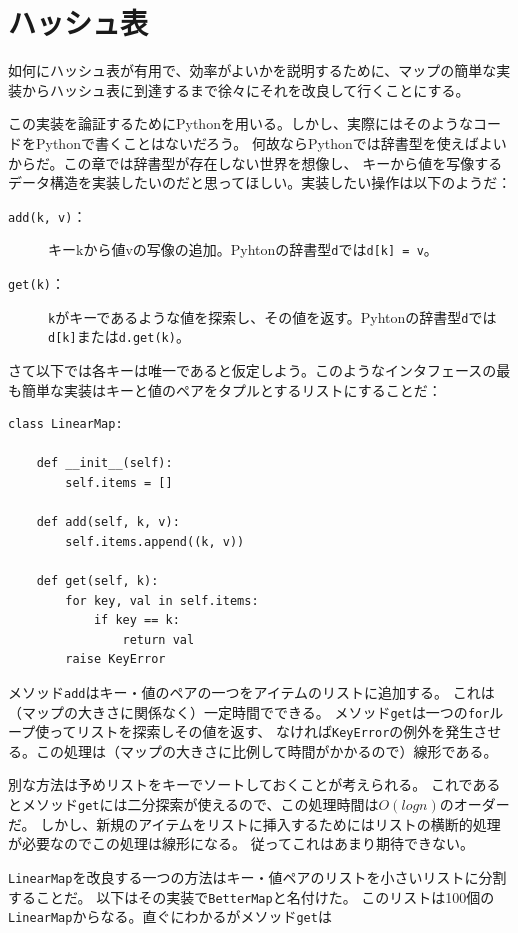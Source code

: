 \documentclass[a4j,12pt,makeidx]{jbook}
\begin{document}
\section{ハッシュ表}
如何にハッシュ表が有用で、効率がよいかを説明するために、マップの簡単な実装からハッシュ表に到達するまで徐々にそれを改良して行くことにする。\par
この実装を論証するためにPythonを用いる。しかし、実際にはそのようなコードをPythonで書くことはないだろう。
何故ならPythonでは辞書型を使えばよいからだ。この章では辞書型が存在しない世界を想像し、
キーから値を写像するデータ構造を実装したいのだと思ってほしい。実装したい操作は以下のようだ：
\begin{description}
\item[{\tt add(k, v)}：] キーkから値vの写像の追加。Pyhtonの辞書型{\tt d}では{\tt d[k] = v}。
\item[{\tt get(k)}：] {\tt k}がキーであるような値を探索し、その値を返す。Pyhtonの辞書型{\tt d}では{\tt d[k]}または{\tt d.get(k)}。
\end{description} \par
さて以下では各キーは唯一であると仮定しよう。このようなインタフェースの最も簡単な実装はキーと値のペアをタプルとするリストにすることだ：
\begin{verbatim}
class LinearMap:

    def __init__(self):
        self.items = []

    def add(self, k, v):
        self.items.append((k, v))

    def get(self, k):
        for key, val in self.items:
            if key == k:
                return val
        raise KeyError
\end{verbatim}
メソッド{\tt add}はキー・値のペアの一つをアイテムのリストに追加する。
これは（マップの大きさに関係なく）一定時間でできる。
メソッド{\tt get}は一つの{\tt for}ループ使ってリストを探索しその値を返す、
なければ{\tt KeyError}の例外を発生させる。この処理は（マップの大きさに比例して時間がかかるので）線形である。\par
別な方法は予めリストをキーでソートしておくことが考えられる。
これであるとメソッド{\tt get}には二分探索が使えるので、この処理時間は$O(logn)$のオーダーだ。
しかし、新規のアイテムをリストに挿入するためにはリストの横断的処理が必要なのでこの処理は線形になる。
従ってこれはあまり期待できない。\par
{\tt LinearMap}を改良する一つの方法はキー・値ペアのリストを小さいリストに分割することだ。
以下はその実装で{\tt BetterMap}と名付けた。
このリストは100個の{\tt LinearMap}からなる。直ぐにわかるがメソッド{\tt get}は
\end{document}
